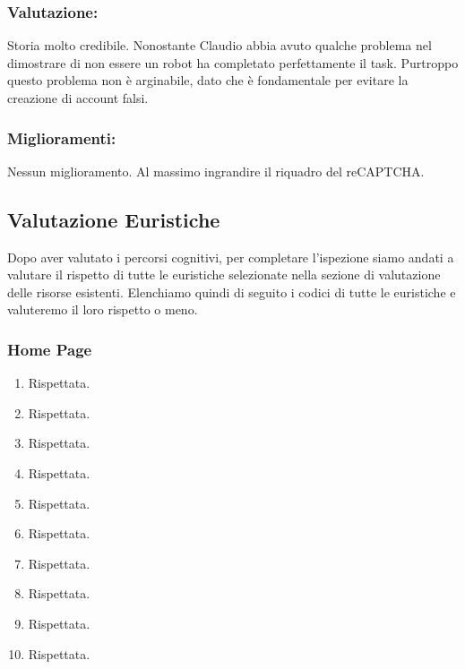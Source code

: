 \documentclass[../Report.tex]{subfiles}
\begin{document}
    \subsubsection{Valutazione:}
    Storia molto credibile. Nonostante Claudio abbia avuto qualche problema nel dimostrare di non essere un robot ha completato perfettamente il task. Purtroppo questo problema non è arginabile, dato che è fondamentale per evitare la creazione di account falsi.
    \subsubsection{Miglioramenti:}
    Nessun miglioramento. Al massimo ingrandire il riquadro del reCAPTCHA.
    
    \subsection{Valutazione Euristiche}
    Dopo aver valutato i percorsi cognitivi, per completare l'ispezione siamo andati a valutare il rispetto di tutte le euristiche selezionate nella sezione di valutazione delle risorse esistenti. Elenchiamo quindi di seguito i codici di tutte le euristiche e valuteremo il loro rispetto o meno.
    \subsubsection{Home Page}
    \begin{enumerate}
        \item Rispettata.
        \item Rispettata.
        \item Rispettata.
        \item Rispettata.
        \item Rispettata.
        \item Rispettata.
        \item Rispettata.
        \item Rispettata.
        \item Rispettata.
        \item Rispettata.
    \end{enumerate}
\end{document}
